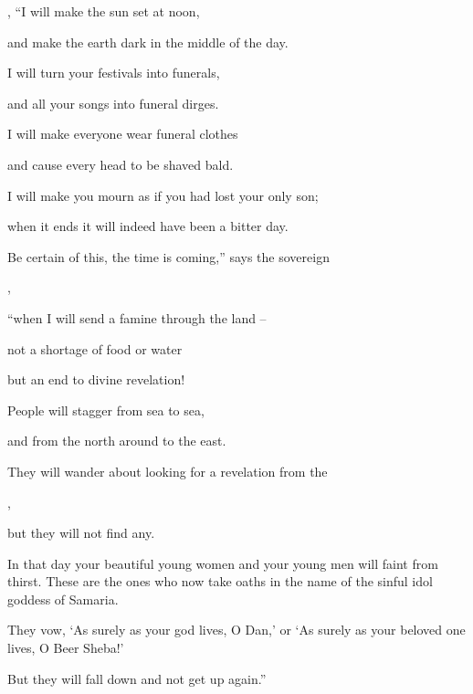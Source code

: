 {{}, “I will make the sun
set
at noon,
\par }{\Q and make the earth
dark
in the middle
of the day.
\par }{\Q {}I will turn
your festivals
into funerals,
\par }{\Q and all
your songs
into funeral dirges.
\par }{\Q I will make
everyone
wear funeral clothes
\par }{\Q and cause every
head
to be shaved bald.
\par }{\Q I will make
you mourn
as if you had lost your only son;
\par }{\Q when it ends
it will indeed have been a bitter
day.
\par }{\Q {}Be certain of this,
the time
is coming,”
says
the sovereign

{},
\par }{\Q “when I will send
a famine
through the land
–
\par }{\Q not
a shortage
of food
or
water
\par }{\Q but
an end to divine revelation!
\par }{\Q {}People will stagger
from sea
to
sea,
\par }{\Q and from the north
around to
the east.
\par }{\Q They will wander about
looking
for a revelation
from the

{},
\par }{\Q but they will not
find any.
\par }{\Q {}In that day
your beautiful
young women
and your young men
will faint
from thirst.
These are the ones who now take oaths
in the name of the sinful
idol goddess of Samaria.
\par }{\Q They vow, ‘As surely
as your god
lives, O Dan,’
or ‘As surely as your beloved
one lives,
O Beer Sheba!’
\par }{\Q But they will fall down
and not
get up
again.”

\par }

